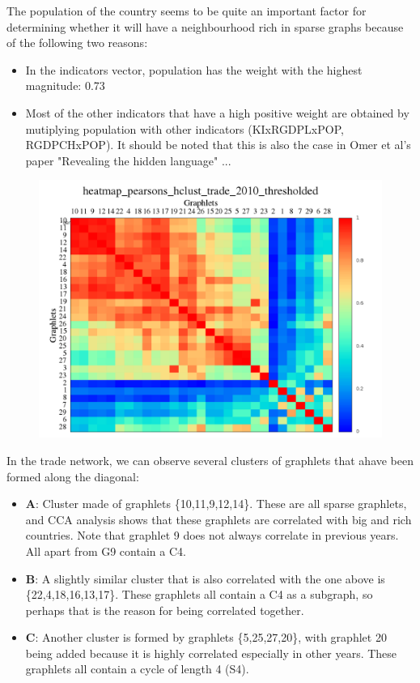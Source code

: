 \documentclass[11pt,a4paper,oneside]{report}
\begin{document}
The population of the country seems to be quite an important factor for determining whether it will have a neighbourhood rich in sparse graphs because of the following two reasons:
\begin{itemize}
 \item In the indicators vector, population has the weight with the highest magnitude: 0.73
 \item Most of the other indicators that have a high positive weight are obtained by mutiplying population with other indicators (KIxRGDPLxPOP, RGDPCHxPOP). It should be noted that this is also the case in Omer et al's paper "Revealing the hidden language" ...
\end{itemize}


\begin{figure}[H]
  \centering
\includegraphics[scale=0.4]
{../code/final_results_norm1/trade_2010_thresholded/heatmap_pearsons_hclust_trade_2010_thresholded.png}
\caption{}
\label{fig:trade}
\end{figure}

In the trade network, we can observe several clusters of graphlets that ahave been formed along the diagonal:
\begin{itemize}
 \item \textbf{A}: Cluster made of graphlets \{10,11,9,12,14\}. These are all sparse graphlets, and CCA analysis shows that these graphlets are correlated with big and rich countries. Note that graphlet 9 does not always correlate in previous years. All apart from G9 contain a C4.
 \item \textbf{B}: A slightly similar cluster that is also correlated with the one above is \{22,4,18,16,13,17\}. These graphlets all contain a C4 as a subgraph, so perhaps that is the reason for being correlated together.
 \item \textbf{C}: Another cluster is formed by graphlets \{5,25,27,20\}, with graphlet 20 being added because it is highly correlated especially in other years. These graphlets all contain a cycle of length 4 (S4).  
\end{itemize}
\end{document}
